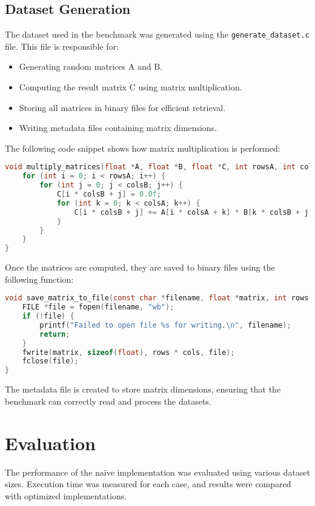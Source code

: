 \documentclass[12pt]{article}
\begin{document}
\subsection{Dataset Generation}
The dataset used in the benchmark was generated using the \texttt{generate\_dataset.c} file. This file is responsible for:
\begin{itemize}
    \item Generating random matrices A and B.
    \item Computing the result matrix C using matrix multiplication.
    \item Storing all matrices in binary files for efficient retrieval.
    \item Writing metadata files containing matrix dimensions.
\end{itemize}

The following code snippet shows how matrix multiplication is performed:
\begin{lstlisting}[language=C, style=customc, caption=Matrix Multiplication in Dataset Generation]
void multiply_matrices(float *A, float *B, float *C, int rowsA, int colsA, int colsB) {
    for (int i = 0; i < rowsA; i++) {
        for (int j = 0; j < colsB; j++) {
            C[i * colsB + j] = 0.0f;
            for (int k = 0; k < colsA; k++) {
                C[i * colsB + j] += A[i * colsA + k] * B[k * colsB + j];
            }
        }
    }
}
\end{lstlisting}

Once the matrices are computed, they are saved to binary files using the following function:
\begin{lstlisting}[language=C, style=customc, caption=Saving Matrices to Files]
void save_matrix_to_file(const char *filename, float *matrix, int rows, int cols) {
    FILE *file = fopen(filename, "wb");
    if (!file) {
        printf("Failed to open file %s for writing.\n", filename);
        return;
    }
    fwrite(matrix, sizeof(float), rows * cols, file);
    fclose(file);
}
\end{lstlisting}

The metadata file is created to store matrix dimensions, ensuring that the benchmark can correctly read and process the datasets. 


\section{Evaluation}
The performance of the naïve implementation was evaluated using various dataset sizes. Execution time was measured for each case, and results were compared with optimized implementations.
\end{document}
